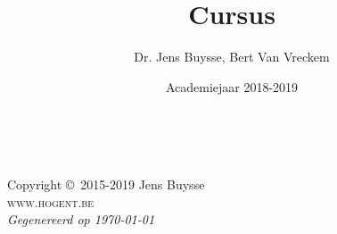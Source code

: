 \documentclass[11pt,fleqn,a4paper]{book}
\author{Dr. Jens Buysse, Bert {Van Vreckem}}
\title{Cursus }
\date{Academiejaar 2018-2019}
\begin{document}
\thetitlepage


\newpage
~\vfill
\thispagestyle{empty}

\noindent Copyright \copyright\ 2015-2019 Jens Buysse\\ %

\noindent \textsc{www.hogent.be}\\ %

\noindent \textit{Gegenereerd op \today} %


\usechapterimagefalse

\tableofcontents %

\cleardoublepage %

\setlength{\parindent}{0pt}

\def\R{\mathbb{R}}






\begin{appendices}



\clearpage
{}
\printbibliography

\clearpage
{}
\printindex
\end{appendices}
\end{document}
